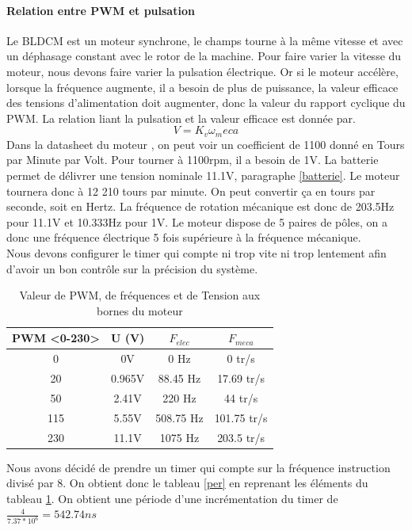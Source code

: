 			\paragraph{Relation entre PWM et pulsation}
			Le BLDCM est un moteur synchrone, le champs tourne à la même vitesse et avec un déphasage constant avec le rotor de la machine. Pour faire varier la vitesse du moteur, nous devons faire varier la pulsation électrique. Or si le moteur accélère, lorsque la fréquence augmente, il a besoin de plus de puissance, la valeur efficace des tensions d'alimentation doit augmenter, donc la valeur du rapport cyclique du PWM. La relation liant la pulsation et la valeur efficace est donnée par.
			$$V=K_v \omega_meca$$
			Dans la datasheet du moteur \cite{moteur}, on peut voir un coefficient de 1100 donné en Tours par Minute par Volt.
			Pour tourner à 1100rpm, il a besoin de 1V. La batterie permet de délivrer une tension nominale 11.1V, paragraphe \ref{batterie}. Le moteur tournera donc à 12 210 tours par minute. On peut convertir ça en tours par seconde, soit en Hertz. La fréquence de rotation mécanique est donc de 203.5Hz pour 11.1V et 10.333Hz pour 1V.
			Le moteur dispose de 5 paires de pôles, on a donc une fréquence électrique 5 fois supérieure à la fréquence mécanique.
			$$ $$
			Nous devons configurer le timer qui compte ni trop vite ni trop lentement afin d'avoir un bon contrôle sur la précision du système.
			\begin{table}[hb]
			\begin{tabular}{|c|c|c|c|}
			PWM <0-230> & U (V) & $F_{elec}$ & $F_{meca}$ \\ 
			\hline 
			0 & 0V & 0 Hz & 0 tr/s \\ 
			20 & 0.965V &  88.45 Hz & 17.69 tr/s \\ 
			50 & 2.41V &  220 Hz & 44 tr/s \\ 
			115 & 5.55V & 508.75 Hz & 101.75 tr/s \\ 
			230 & 11.1V & 1075 Hz & 203.5 tr/s \\ 
			\end{tabular} 
			\caption{Valeur de PWM, de fréquences et de Tension aux bornes du moteur}
			\label{freqPWMVitesse}
			\end{table}
			Nous avons décidé de prendre un timer qui compte sur la fréquence instruction divisé par 8. On obtient donc le tableau \ref{per} en reprenant les éléments du tableau \ref{freqPWMVitesse}. On obtient une période d'une incrémentation du timer de $\frac{4}{7.37*10^6}=542.74ns$
